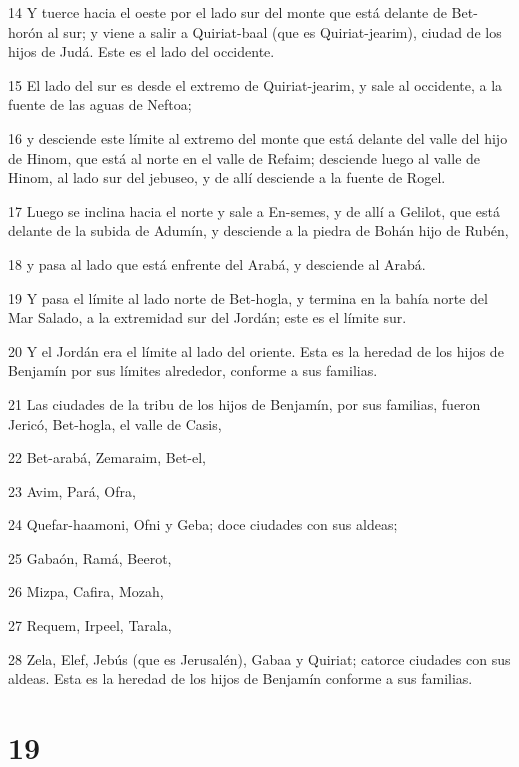 \par 14 Y tuerce hacia el oeste por el lado sur del monte que está delante de Bet-horón al sur; y viene a salir a Quiriat-baal (que es Quiriat-jearim), ciudad de los hijos de Judá. Este es el lado del occidente.
\par 15 El lado del sur es desde el extremo de Quiriat-jearim, y sale al occidente, a la fuente de las aguas de Neftoa;
\par 16 y desciende este límite al extremo del monte que está delante del valle del hijo de Hinom, que está al norte en el valle de Refaim; desciende luego al valle de Hinom, al lado sur del jebuseo, y de allí desciende a la fuente de Rogel.
\par 17 Luego se inclina hacia el norte y sale a En-semes, y de allí a Gelilot, que está delante de la subida de Adumín, y desciende a la piedra de Bohán hijo de Rubén,
\par 18 y pasa al lado que está enfrente del Arabá, y desciende al Arabá.
\par 19 Y pasa el límite al lado norte de Bet-hogla, y termina en la bahía norte del Mar Salado, a la extremidad sur del Jordán; este es el límite sur.
\par 20 Y el Jordán era el límite al lado del oriente. Esta es la heredad de los hijos de Benjamín por sus límites alrededor, conforme a sus familias.
\par 21 Las ciudades de la tribu de los hijos de Benjamín, por sus familias, fueron Jericó, Bet-hogla, el valle de Casis,
\par 22 Bet-arabá, Zemaraim, Bet-el,
\par 23 Avim, Pará, Ofra,
\par 24 Quefar-haamoni, Ofni y Geba; doce ciudades con sus aldeas;
\par 25 Gabaón, Ramá, Beerot,
\par 26 Mizpa, Cafira, Mozah,
\par 27 Requem, Irpeel, Tarala,
\par 28 Zela, Elef, Jebús (que es Jerusalén), Gabaa y Quiriat; catorce ciudades con sus aldeas. Esta es la heredad de los hijos de Benjamín conforme a sus familias.

\chapter{19}

